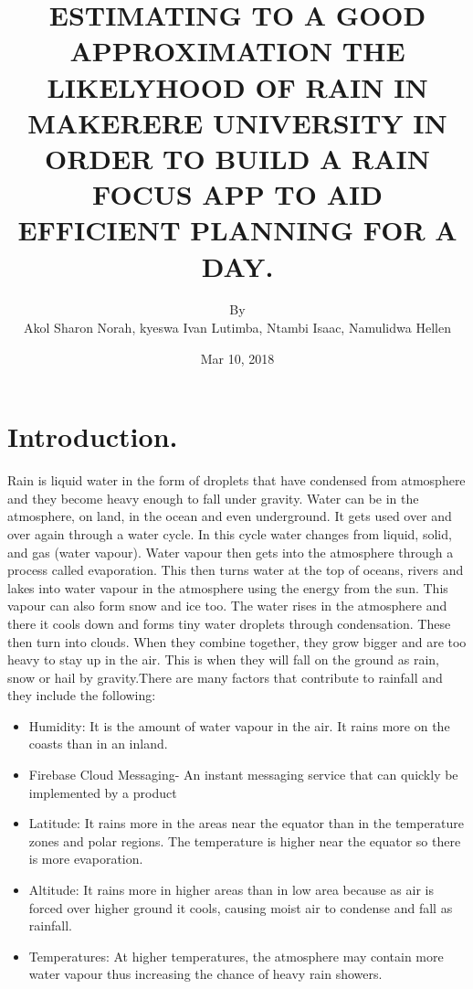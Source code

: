 \documentclass{article}
\title{ESTIMATING TO A GOOD APPROXIMATION THE LIKELYHOOD OF RAIN IN MAKERERE UNIVERSITY IN ORDER TO BUILD A RAIN FOCUS APP TO AID EFFICIENT PLANNING FOR A DAY.
}
\author{By\\Akol Sharon Norah, kyeswa Ivan Lutimba, Ntambi Isaac, Namulidwa Hellen}
\date{Mar 10, 2018}
\begin{document}
\maketitle

\newpage

\section{Introduction.}
Rain is liquid water in the form of droplets that have condensed from atmosphere and they become heavy enough to fall under gravity.
Water can be in the atmosphere, on land, in the ocean and even underground. It gets used over and over again through a water cycle. In this cycle water changes from liquid, solid, and gas (water vapour). Water vapour then gets into the atmosphere through a process called evaporation. This then turns water at the top of oceans, rivers and lakes into water vapour in the atmosphere using the energy from the sun. This vapour can also form snow and ice too. The water rises in the atmosphere and there it cools down and forms tiny water droplets through condensation. These then turn into clouds. When they combine together, they grow bigger and are too heavy to stay up in the air. This is when they will fall on the ground as rain, snow or hail by gravity.There are many factors that contribute to rainfall and they include the following:


\begin{itemize}
    \item Humidity: It is the amount of water vapour in the air. It rains more on the coasts than in an inland.

    \item Firebase Cloud Messaging- An instant messaging service that can quickly be implemented by a product
    \item Latitude:  It rains more in the areas near the equator than in the temperature zones and polar regions. The temperature is higher near the equator so there is more evaporation.
    \item Altitude: It rains more in higher areas than in low area because as air is forced over higher ground it cools, causing moist air to condense and fall as rainfall.
    \item Temperatures: At higher temperatures, the atmosphere may contain more water vapour thus increasing the chance of heavy rain showers.

    \end{itemize}
\end{document}
